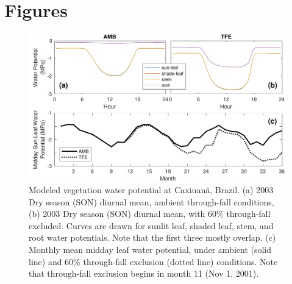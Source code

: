\documentclass[draft,linenumbers]{agujournal}
\begin{document}
\section{Figures}
  \begin{figure}[h]
     \centering
     \includegraphics[width=30pc]{../figs2/fig2.pdf}
     \caption{Modeled vegetation water potential at  Caxiuan\~a, Brazil.
     (a) 2003 Dry season (SON) diurnal mean, ambient through-fall conditions,
     (b) 2003 Dry season (SON) diurnal mean, with 60\% through-fall excluded.
     Curves are drawn for sunlit leaf, shaded leaf, stem, and root water potentials. Note that the first three mostly overlap.
     (c) Monthly mean midday leaf water potential, under ambient (solid line) and 60\% through-fall exclusion (dotted line) conditions.
     Note that through-fall exclusion begins in month 11 (Nov 1, 2001).
     }
     \label{fig:vwp}
  \end{figure}
  
\end{document}

